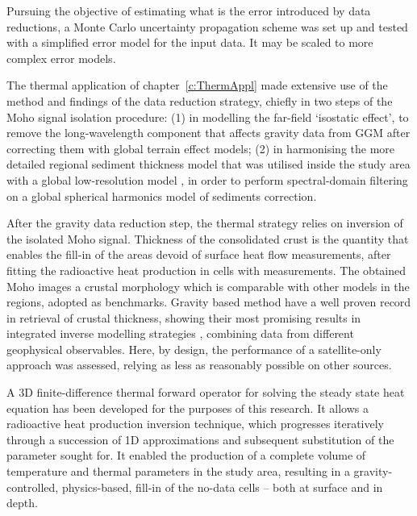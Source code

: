 Pursuing the objective of estimating what is the error introduced by data reductions, a Monte Carlo uncertainty propagation scheme was set up and tested with a simplified error model for the input data.
It may be scaled to more complex error models.

The thermal application of chapter~\ref{c:ThermAppl} made extensive use of the method and findings of the data reduction strategy, chiefly in two steps of the Moho signal isolation procedure:
(1) in modelling the far-field `isostatic effect', to remove the long-wavelength component that affects gravity data from GGM after correcting them with global terrain effect models; (2) in harmonising the more detailed regional sediment thickness model that was utilised inside the study area \parencite[{EuCRUST},][]{Tesauro2008} with a global low-resolution model \parencite[{LITHO1.0},][]{Pasyanos2014}, in order to perform spectral-domain filtering on a global spherical harmonics model of sediments correction.

After the gravity data reduction step, the thermal strategy relies on inversion of the isolated Moho signal.
Thickness of the consolidated crust is the quantity that enables the fill-in of the areas devoid of surface heat flow measurements, after fitting the radioactive heat production in cells with measurements.
The obtained Moho images a crustal morphology which is comparable with other models in the regions, adopted as benchmarks.
Gravity based method have a well proven record in retrieval of crustal thickness, showing their most promising results in integrated inverse modelling strategies \parencites[e.g.][]{Eshagh2011}{Reguzzoni2015}, combining data from different geophysical observables.
Here, by design, the performance of a satellite-only approach was assessed, relying as less as reasonably possible on other sources.

A 3D finite-difference thermal forward operator for solving the steady state heat equation has been developed for the purposes of this research.
It allows a radioactive heat production inversion technique, which progresses iteratively through a succession of 1D approximations and subsequent substitution of the parameter sought for.
It enabled the production of a complete volume of temperature and thermal parameters in the study area, resulting in a gravity-controlled, physics-based, fill-in of the no-data cells -- both at surface and in depth.

